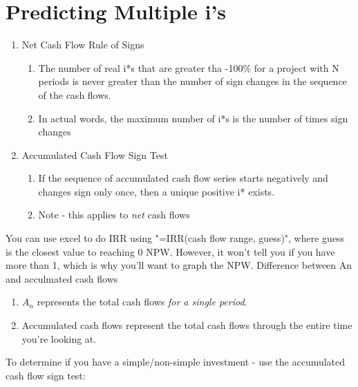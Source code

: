 \documentclass{report} %
\begin{document}
\section*{Predicting Multiple i's}
\begin{enumerate}
    \item Net Cash Flow Rule of Signs
        \begin{enumerate}
            \item The number of real i*s that are greater tha -100\% for a project with N periods is never greater than the number of sign changes in the sequence of the cash flows. 
            \item In actual words, the maximum number of i*s is the number of times sign changes
        \end{enumerate}
    \item Accumulated Cash Flow Sign Test
        \begin{enumerate}
            \item If the sequence of accumulated cash flow series starts negatively and changes sign only once, then a unique positive i* exists.
            \item Note - this applies to \emph{net} cash flows
        \end{enumerate}
\end{enumerate}
You can use excel to do IRR using "=IRR(cash flow range, guess)", where guess is the closest value to reaching 0 NPW. However, it won't tell you if you have more than 1, which is why you'll want to graph the NPW.
Difference between An and acculmated cash flows
\begin{enumerate}
    \item $A_n$ represents the total cash flows \emph{for a single period}.
    \item Accumulated cash flows represent the total cash flows through the entire time you're looking at.
\end{enumerate}
To determine if you have a simple/non-simple investment - use the accumulated cash flow sign test:
\end{document}
